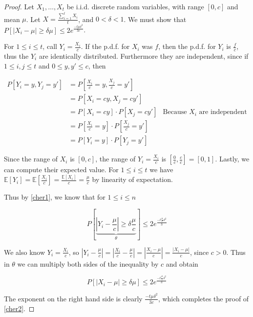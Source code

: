 \documentclass[11pt]{amsart}
\begin{document}
\begin{proof}
Let $X_1, \dots, X_t$ be i.i.d. discrete random variables, with range $[0, c]$ and mean $\mu$. Let $X = \frac{\sum_{i=1}^t X_i}{t}$, and $0 < \delta < 1$. We must show that $P\left[\left|X_i - \mu\right| \ge \delta \mu\right] \le 2 e^{\frac{-t \mu \delta^2}{3c}}$.

For $1 \le i \le t$, call $Y_i = \frac{X_i}{c}$. If the p.d.f. for $X_i$ was $f$, then the p.d.f. for $Y_i$ is $\frac{f}{c}$, thus the $Y_i$ are identically distributed. Furthermore they are independent, since if $1 \le i, j \le t$ and $0 \le y, y' \le c$, then

\begin{align*}
P[Y_i = y, Y_j = y'] &= P\left[\frac{X_i}{c} = y,  \frac{X_j}{c} = y'\right]&\\
                     &= P[X_i = cy, X_j = cy']&\\
                     &= P[X_i = cy] \cdot P[X_j = cy'] &\text{Because $X_i$ are independent}\\
                     &= P\left[\frac{X_i}{c} = y\right] \cdot P\left[\frac{X_j}{c} = y'\right]&\\
                     &= P[Y_i = y] \cdot P[Y_j = y']&
\end{align*}

Since the range of $X_i$ is $[0, c]$, the range of $Y_i = \frac{X_i}{c}$ is $\left[\frac{0}{c}, \frac{c}{c}\right] = [0, 1]$. Lastly, we can compute their expected value. For $1 \le i \le t$ we have $\mathbb{E}[Y_i] = \mathbb{E}\left[\frac{X_i}{c}\right] = \frac{\mathbb{E}\left[X_i\right]}{c} = \frac{\mu}{c}$ by linearity of expectation.

Thus by \ref{cher1}, we know that for $1 \le i \le n$

$$
P\left[\underbrace{\left|Y_i - \frac{\mu}{c}\right| \ge \delta \frac{\mu}{c}}_{\theta}\right] \le 2 e^{\frac{-t \frac{\mu}{c} \delta^2}{3}}
$$

We also know $Y_i = \frac{X_i}{c}$, so $\left|Y_i - \frac{\mu}{c}\right| = \left|\frac{X_i}{c} - \frac{\mu}{c}\right| = \left|\frac{X_i - \mu}{c}\right| = \frac{\left|X_i - \mu\right|}{c}$, since $c > 0$. Thus in $\theta$ we can multiply both sides of the inequality by $c$ and obtain

$$
P\left[\left|X_i - \mu\right| \ge \delta \mu\right] \le 2 e^{\frac{-t \frac{\mu}{c} \delta^2}{3}}
$$

The exponent on the right hand side is clearly $\frac{-t \mu \delta^2}{3c}$, which completes the proof of \ref{cher2}.
\end{proof}
\end{document}
